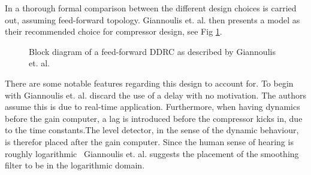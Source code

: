 \documentclass[../main2.tex]{subfiles}
\providecommand{\rootdir}{..}
\begin{document}
In \cite{reiss2012tutorial} a thorough formal comparison between the different design choices is carried out, assuming feed-forward topology. Giannoulis et. al.  then presents a model as their recommended choice for compressor design, see Fig \ref{fig:block_giannoulis}.
\begin{figure}

\caption{Block diagram of a feed-forward DDRC as described by Giannoulis et. al.}
\label{fig:block_giannoulis}
\end{figure}
There are some notable features regarding this design to account for. To begin with Giannoulis et. al. discard the use of a delay with no motivation. The authors assume this is due to real-time application. Furthermore, when having dynamics before the gain computer, a lag is introduced before the compressor kicks in, due to the time constants.The level detector, in the sense of the dynamic behaviour, is therefor placed after the gain computer. Since the human sense of hearing is roughly logarithmic~\cite{fastl2007psychoacoustics} Giannoulis et. al. suggests the placement of the smoothing filter to be in the logarithmic domain.
 
\end{document}
